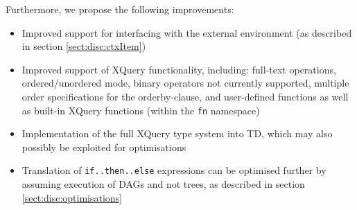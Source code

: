 Furthermore, we propose the following improvements:
\begin{itemize}
  \item Improved support for interfacing with the external environment (as
  described in section \ref{sect:disc:ctxItem})
  \item Improved support of XQuery functionality, including: full-text
  operations, ordered/unordered mode, binary operators not currently supported,
  multiple order specifications for the orderby-clause, and user-defined
  functions as well as built-in XQuery functions (within the \texttt{fn} namespace)
  \item Implementation of the full XQuery type system into TD, which may also
  possibly be exploited for optimisations
  \item Translation of \texttt{if..then..else} expressions can be optimised
  further by assuming execution of DAGs and not trees, as described in section
  \ref{sect:disc:optimisations}
\end{itemize}